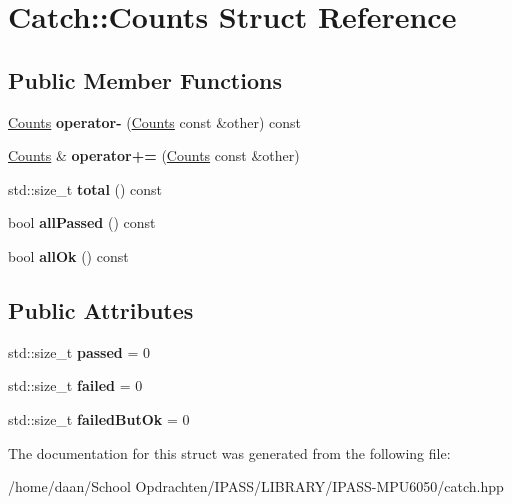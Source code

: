 \hypertarget{structCatch_1_1Counts}{}\section{Catch\+:\+:Counts Struct Reference}
\label{structCatch_1_1Counts}
\subsection*{Public Member Functions}
\begin{DoxyCompactItemize}
\item 
\mbox{\label{structCatch_1_1Counts_aaa10666f559057e3e860d2a5a6fae4c4}} 
\hyperlink{structCatch_1_1Counts}{Counts} {\bfseries operator-\/} (\hyperlink{structCatch_1_1Counts}{Counts} const \&other) const
\item 
\mbox{\label{structCatch_1_1Counts_a322a89475cd2cc039140ef371e973677}} 
\hyperlink{structCatch_1_1Counts}{Counts} \& {\bfseries operator+=} (\hyperlink{structCatch_1_1Counts}{Counts} const \&other)
\item 
\mbox{\label{structCatch_1_1Counts_a94f969c09cf52d1339c085c9603cd1d3}} 
std\+::size\+\_\+t {\bfseries total} () const
\item 
\mbox{\label{structCatch_1_1Counts_a84999490e0ecaa3de5e121bf48eda1b3}} 
bool {\bfseries all\+Passed} () const
\item 
\mbox{\label{structCatch_1_1Counts_a33bd996e016030155b99fe1c51c08991}} 
bool {\bfseries all\+Ok} () const
\end{DoxyCompactItemize}
\subsection*{Public Attributes}
\begin{DoxyCompactItemize}
\item 
\mbox{\label{structCatch_1_1Counts_ad28daaf3de28006400208b6dd0c631e6}} 
std\+::size\+\_\+t {\bfseries passed} = 0
\item 
\mbox{\label{structCatch_1_1Counts_a19982a3817a3bc2c07f0290e71f497a3}} 
std\+::size\+\_\+t {\bfseries failed} = 0
\item 
\mbox{\label{structCatch_1_1Counts_ac090973a2ff51394cd452718e75c073e}} 
std\+::size\+\_\+t {\bfseries failed\+But\+Ok} = 0
\end{DoxyCompactItemize}


The documentation for this struct was generated from the following file\+:\begin{DoxyCompactItemize}
\item 
/home/daan/\+School Opdrachten/\+I\+P\+A\+S\+S/\+L\+I\+B\+R\+A\+R\+Y/\+I\+P\+A\+S\+S-\/\+M\+P\+U6050/catch.\+hpp\end{DoxyCompactItemize}
